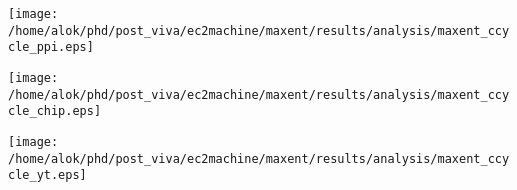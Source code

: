 \begin{center}
 \texttt{[image: /home/alok/phd/post\_viva/ec2machine/maxent/results/analysis/maxent\_ccycle\_ppi.eps]}
\end{center}

\begin{center}
 \texttt{[image: /home/alok/phd/post\_viva/ec2machine/maxent/results/analysis/maxent\_ccycle\_chip.eps]}
\end{center}
\begin{center}
 \texttt{[image: /home/alok/phd/post\_viva/ec2machine/maxent/results/analysis/maxent\_ccycle\_yt.eps]}
\end{center}
